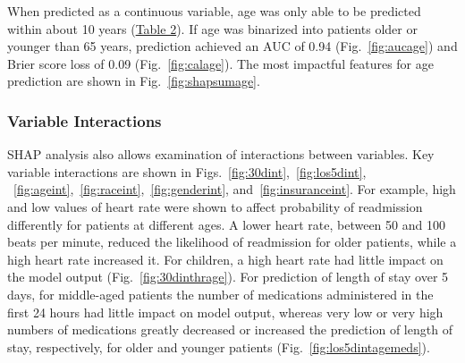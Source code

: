 When predicted as a continuous variable, age was only able to be predicted within about 10 years (\hyperref[table:table2]{Table 2}).\@
If age was binarized into patients older or younger than 65 years, 
prediction achieved an AUC of 0.94 (Fig.\ \ref{fig:aucage}) and Brier score loss of 0.09 (Fig.\ \ref{fig:calage}).\@
The most impactful features for age prediction are shown in Fig.\ \ref{fig:shapsumage}.\@

\subsubsection{{Variable Interactions}}
SHAP analysis also allows examination of interactions between variables.\@
Key variable interactions are shown in Figs.\ \ref{fig:30dint},~\ref{fig:los5dint},%
~\ref{fig:ageint},~\ref{fig:raceint},~\ref{fig:genderint}, and~\ref{fig:insuranceint}.\@ 
For example, high and low values of heart rate were shown to affect probability of readmission
differently for patients at different ages. A lower heart rate, between 50 and 100 beats per minute,
reduced the likelihood of readmission for older patients, while a high heart rate increased it.\@
For children, a high heart rate had little impact on the model output (Fig.\ \ref{fig:30dinthrage}).\@
For prediction of length of stay over 5 days, for middle-aged patients the number of medications
administered in the first 24 hours had little impact on model output, whereas very low or very high
numbers of medications greatly decreased or increased the prediction of length of stay, respectively,
for older and younger patients (Fig.\ \ref{fig:los5dintagemeds}).\@
